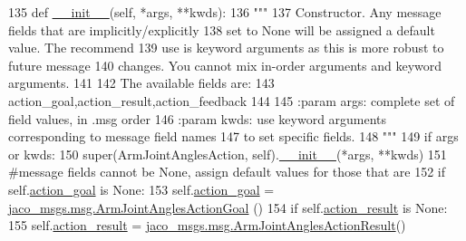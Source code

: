 \begin{DoxyCode}
135   \textcolor{keyword}{def }\hyperlink{classjaco__msgs_1_1msg_1_1__ArmJointAnglesAction_1_1ArmJointAnglesAction_a8439ec228e0e1910a6a0349a3296903b}{\_\_init\_\_}(self, *args, **kwds):
136     \textcolor{stringliteral}{"""}
137 \textcolor{stringliteral}{    Constructor. Any message fields that are implicitly/explicitly}
138 \textcolor{stringliteral}{    set to None will be assigned a default value. The recommend}
139 \textcolor{stringliteral}{    use is keyword arguments as this is more robust to future message}
140 \textcolor{stringliteral}{    changes.  You cannot mix in-order arguments and keyword arguments.}
141 \textcolor{stringliteral}{}
142 \textcolor{stringliteral}{    The available fields are:}
143 \textcolor{stringliteral}{       action\_goal,action\_result,action\_feedback}
144 \textcolor{stringliteral}{}
145 \textcolor{stringliteral}{    :param args: complete set of field values, in .msg order}
146 \textcolor{stringliteral}{    :param kwds: use keyword arguments corresponding to message field names}
147 \textcolor{stringliteral}{    to set specific fields.}
148 \textcolor{stringliteral}{    """}
149     \textcolor{keywordflow}{if} args \textcolor{keywordflow}{or} kwds:
150       super(ArmJointAnglesAction, self).\hyperlink{classjaco__msgs_1_1msg_1_1__ArmJointAnglesAction_1_1ArmJointAnglesAction_a8439ec228e0e1910a6a0349a3296903b}{\_\_init\_\_}(*args, **kwds)
151       \textcolor{comment}{#message fields cannot be None, assign default values for those that are}
152       \textcolor{keywordflow}{if} self.\hyperlink{classjaco__msgs_1_1msg_1_1__ArmJointAnglesAction_1_1ArmJointAnglesAction_a1228b85cf05f4f9a13183afd184c00ac}{action\_goal} \textcolor{keywordflow}{is} \textcolor{keywordtype}{None}:
153         self.\hyperlink{classjaco__msgs_1_1msg_1_1__ArmJointAnglesAction_1_1ArmJointAnglesAction_a1228b85cf05f4f9a13183afd184c00ac}{action\_goal} = \hyperlink{classjaco__msgs_1_1msg_1_1__ArmJointAnglesActionGoal_1_1ArmJointAnglesActionGoal}{jaco\_msgs.msg.ArmJointAnglesActionGoal}
      ()
154       \textcolor{keywordflow}{if} self.\hyperlink{classjaco__msgs_1_1msg_1_1__ArmJointAnglesAction_1_1ArmJointAnglesAction_ac598eb04beb335c402cad157a16c96e5}{action\_result} \textcolor{keywordflow}{is} \textcolor{keywordtype}{None}:
155         self.\hyperlink{classjaco__msgs_1_1msg_1_1__ArmJointAnglesAction_1_1ArmJointAnglesAction_ac598eb04beb335c402cad157a16c96e5}{action\_result} = 
      \hyperlink{classjaco__msgs_1_1msg_1_1__ArmJointAnglesActionResult_1_1ArmJointAnglesActionResult}{jaco\_msgs.msg.ArmJointAnglesActionResult}()

\end{DoxyCode}
